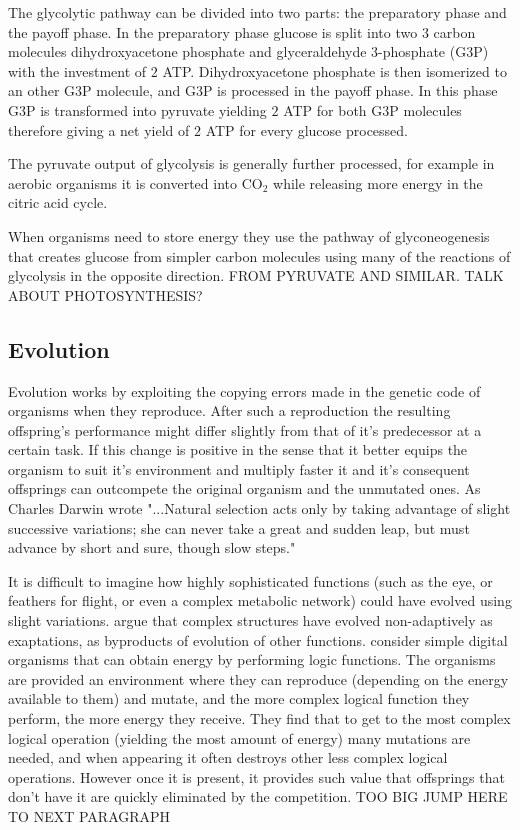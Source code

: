 \documentclass[a4paper,12pt]{article}
\begin{document}
The glycolytic pathway can be divided into two parts: the preparatory phase and the payoff phase. In the preparatory phase glucose is split into two $3$ carbon molecules dihydroxyacetone phosphate and glyceraldehyde 3-phosphate (G3P) with the investment of $2$ ATP. Dihydroxyacetone phosphate is then isomerized to an other G3P molecule, and G3P is processed in the payoff phase. In this phase G3P is transformed into pyruvate yielding $2$ ATP for both G3P molecules therefore giving a net yield of $2$ ATP for every glucose processed. 

The pyruvate output of glycolysis is generally further processed, for example in aerobic organisms it is converted into CO$_2$ while releasing more energy in the citric acid cycle. 

When organisms need to store energy they use the pathway of glyconeogenesis that creates glucose from simpler carbon molecules using many of the reactions of glycolysis in the opposite direction. FROM PYRUVATE AND SIMILAR. TALK ABOUT PHOTOSYNTHESIS?
	
	\subsection{Evolution}\label{chap:evolution}
	
	Evolution works by exploiting the copying errors made in the genetic code of organisms when they reproduce. After such a reproduction the resulting offspring's performance might differ slightly from that of it's predecessor at a certain task. If this change is positive in the sense that it better equips the organism to suit it's environment and multiply faster it and it's consequent offsprings can outcompete the original organism and the unmutated ones.  As Charles Darwin wrote "...Natural selection acts only by taking advantage of slight successive variations; she can never take a great and sudden leap, but must advance by short and sure, though slow steps." \cite{darwin} 
	
	It is difficult to imagine how highly sophisticated functions (such as the eye, or feathers for flight, or even a complex metabolic network) could have evolved using slight variations. \cite{latent} argue that complex structures have evolved non-adaptively as exaptations, as byproducts of evolution of other functions. \cite{complexfeatures}  consider simple digital organisms that can obtain energy by performing logic functions. The organisms are provided an environment where they can reproduce (depending on the energy available to them) and mutate, and the more complex logical function they perform, the more energy they receive. They find that to get to the most complex logical operation (yielding the most amount of energy) many mutations are needed, and when appearing it often destroys other less complex logical operations. However once it is present, it provides such value that offsprings that don't have it are quickly eliminated by the competition. TOO BIG JUMP HERE TO NEXT PARAGRAPH
	
\end{document}
